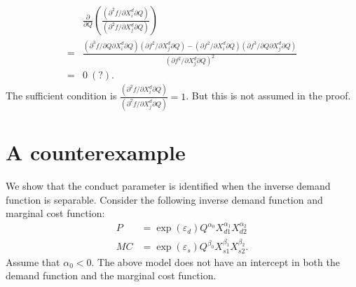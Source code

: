 \documentclass[11pt, a4paper]{article}
\theoremstyle{remark}
\begin{document}
\begin{itemize}
\begin{align}
        & \frac{\partial }{\partial Q} \left(\frac{(\partial^2 f/\partial X^{d}_{i} \partial Q)}{(\partial^2 f/\partial X^{d}_{j} \partial Q)}  \right)\\
        = &   \frac{(\partial^3 f/\partial Q\partial X^{d}_{i} \partial Q)(\partial f^2/\partial X^{d}_{j} \partial Q) - (\partial f^2/\partial X^{d}_{i} \partial Q)(\partial f^3/\partial Q\partial X^{d}_{j} \partial Q)}{(\partial f^2/\partial X^{d}_{j} \partial Q)^2}\\
        =& 0\ (?).
    \end{align}
    The sufficient condition is $\frac{(\partial^2 f/\partial X^{d}_{i} \partial Q)}{(\partial^2 f/\partial X^{d}_{j} \partial Q)} = 1$.
    But this is not assumed in the proof.
\end{itemize}

\section{A counterexample}

We show that the conduct parameter is identified when the inverse demand function is separable. 
Consider the following inverse demand function and marginal cost function:
\begin{align}
    P & = \exp(\varepsilon_{d}) Q^{\alpha_0} X_{d1}^{\alpha_1}X_{d2}^{\alpha_2}\label{eq:counter_demand}\\
    MC & = \exp(\varepsilon_{s})Q^{\beta_0} X_{s1}^{\beta_1} X_{s2}^{\beta_2}.\label{eq:counter_mc}
\end{align}
Assume that $\alpha_0 <0$.
The above model does not have an intercept in both the demand function and the marginal cost function. 
\end{document}
